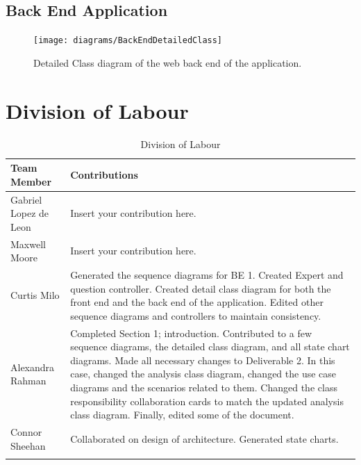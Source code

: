 \documentclass[titlepage]{article}
\begin{document}
\subsection{Back End Application}
\begin{figure}[H]
\texttt{[image: diagrams/BackEndDetailedClass]}
\caption{Detailed Class diagram of the web back end of the application.}\label{sd:web_application}
\end{figure}

\pagebreak
\appendix
\section{Division of Labour}
\label{sec:division_of_labour}

\begin{longtable}{| p{} | p{} |}
			\hline
			\textbf {Team Member} & \textbf{Contributions}\\ 
			\hline
			Gabriel Lopez de Leon & Insert your contribution here.
			\\
			\hline
			Maxwell Moore & Insert your contribution here.
			\\
			\hline
			Curtis Milo & Generated the sequence diagrams for BE 1. Created Expert and question controller. Created detail class diagram for both the front end and the back end of the application. Edited other sequence diagrams and controllers to maintain consistency.
			\\ 
			\hline
			Alexandra Rahman & Completed Section 1; introduction. Contributed to a few sequence diagrams, the detailed class diagram, and all state chart diagrams. Made all necessary changes to Deliverable 2. In this case, changed the analysis class diagram, changed the use case diagrams and the scenarios related to them. Changed the class responsibility collaboration cards to match the updated analysis class diagram. Finally, edited some of the document.
			\\
			\hline
			Connor Sheehan & Collaborated on design of architecture. Generated state charts.
			\\
			\hline
			
			\caption{Division of Labour}
	\end{longtable}
\end{document}
